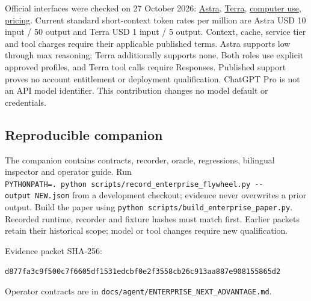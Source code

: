 \documentclass[
  10pt,
]{article}
\begin{document}
Official interfaces were checked on 27 October 2026:
\href{https://developers.openai.com/api/docs/models/gpt-6-astra}{Astra},
\href{https://developers.openai.com/api/docs/models/gpt-6.1-terra}{Terra},
\href{https://developers.openai.com/api/docs/guides/tools-computer-use}{computer
use}, \href{https://developers.openai.com/api/docs/pricing}{pricing}.
Current standard short-context token rates per million are Astra USD 10
input / 50 output and Terra USD 1 input / 5 output. Context, cache,
service tier and tool charges require their applicable published terms.
Astra supports low through max reasoning; Terra additionally supports
none. Both roles use explicit approved profiles, and Terra tool calls
require Responses. Published support proves no account entitlement or
deployment qualification. ChatGPT Pro is not an API model identifier.
This contribution changes no model default or credentials.

\hypertarget{reproducible-companion}{%
\subsection{Reproducible companion}\label{reproducible-companion}}

The companion contains contracts, recorder, oracle, regressions,
bilingual inspector and operator guide. Run
\texttt{PYTHONPATH=.\ python\ scripts/record\_enterprise\_flywheel.py\ -\/-output\ NEW.json}
from a development checkout; evidence never overwrites a prior output.
Build the paper using
\texttt{python\ scripts/build\_enterprise\_paper.py}. Recorded runtime,
recorder and fixture hashes must match first. Earlier packets retain
their historical scope; model or tool changes require new qualification.

Evidence packet SHA-256:

\texttt{d877fa3c9f500c7f6605df1531edcbf0e2f3558cb26c913aa887e908155865d2}

Operator contracts are in
\texttt{docs/agent/ENTERPRISE\_NEXT\_ADVANTAGE.md}.
\end{document}
